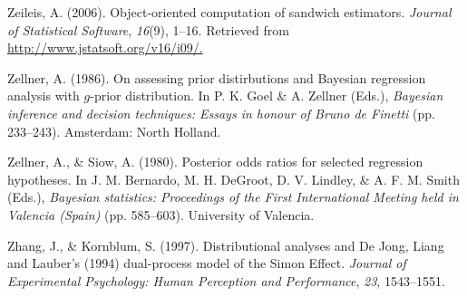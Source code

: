 \documentclass[american,man]{apa6}
\begin{document}
Zeileis, A. (2006). Object-oriented computation of sandwich estimators.
\emph{Journal of Statistical Software}, \emph{16}(9), 1--16. Retrieved
from \url{http://www.jstatsoft.org/v16/i09/.}

Zellner, A. (1986). On assessing prior distirbutions and Bayesian
regression analysis with \(g\)-prior distribution. In P. K. Goel \& A.
Zellner (Eds.), \emph{Bayesian inference and decision techniques: Essays
in honour of Bruno de Finetti} (pp. 233--243). Amsterdam: North Holland.

Zellner, A., \& Siow, A. (1980). Posterior odds ratios for selected
regression hypotheses. In J. M. Bernardo, M. H. DeGroot, D. V. Lindley,
\& A. F. M. Smith (Eds.), \emph{Bayesian statistics: Proceedings of the
First International Meeting held in Valencia (Spain)} (pp. 585--603).
University of Valencia.

Zhang, J., \& Kornblum, S. (1997). Distributional analyses and De Jong,
Liang and Lauber's (1994) dual-process model of the Simon Effect.
\emph{Journal of Experimental Psychology: Human Perception and
Performance}, \emph{23}, 1543--1551.
\end{document}
